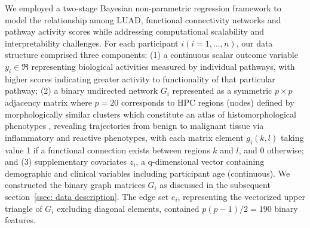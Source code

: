 \documentclass[pdflatex,article,12pt]{article}
\begin{document}
We employed a two-stage Bayesian non-parametric regression framework \cite{ma2022semi} to model the relationship among LUAD, functional connectivity networks and pathway activity scores while addressing computational scalability and interpretability challenges. For each participant $i (i = 1, ..., n)$, our data structure comprised three components: (1) a continuous scalar outcome variable $y_i \in \Re$ representing biological activities measured by individual pathways, with higher scores indicating greater activity to functionality of that particular pathway; (2) a binary undirected network $G_i$ represented as a symmetric $p \times p$ adjacency matrix where $p = 20$ corresponds to HPC regions (nodes) defined by morphologically similar clusters  which constitute an atlas of histomorphological phenotypes \citep{claudio2024mapping}, revealing trajectories from benign to malignant tissue via inflammatory and reactive phenotypes, with each matrix element $g_i(k,l)$ taking value 1 if a functional connection exists between regions $k$ and $l$, and $0$ otherwise; and (3) supplementary covariates $z_i$, a q-dimensional vector containing demographic and clinical variables including participant age (continuous). We constructed the binary graph matrices $G_i$ as discussed in the subsequent section~\ref{ssec: data description}. The edge set $e_i$, representing the vectorized upper triangle of $G_i$ excluding diagonal elements, contained $p(p-1)/2 = 190$ binary features. 
\end{document}
